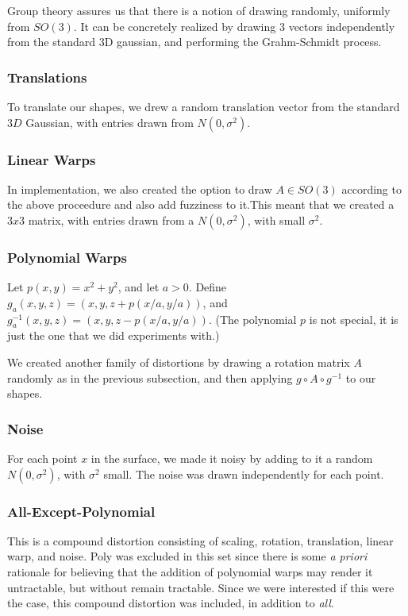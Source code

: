 \documentclass{article}
\begin{document}
Group theory assures us that there is a notion of drawing randomly, uniformly from $SO(3)$.
It can be concretely realized by drawing $3$ vectors independently from the standard 3D gaussian,
and performing the Grahm-Schmidt process.

\subsubsection{Translations}

To translate our shapes, we drew a random translation vector from the standard $3D$ Gaussian, with entries drawn from $N(0,\sigma^2)$.

\subsubsection{Linear Warps}

In implementation, we also created the option to draw $A \in SO(3)$ according to the above proceedure
and also add fuzziness to it.This meant that we created a $3x3$ matrix, with entries drawn from a
$N(0, \sigma^2)$, with small $\sigma^2$.

\subsubsection{Polynomial Warps}

Let $p(x,y) = x^2 + y^2$, and let $a > 0$. Define $g_a(x,y,z) = (x,y,z + p(x/a,y/a))$,
and $g_a^{-1}(x,y,z) = (x,y,z - p(x/a,y/a))$. (The polynomial $p$ is not special,
it is just the one that we did experiments with.)

We created another family of distortions by drawing a rotation matrix $A$ randomly
as in the previous subsection, and then applying $g \circ A \circ g^{-1}$ to our shapes.

\subsubsection{Noise}

For each point $x$ in the surface, we made it noisy by adding to it a random
$N(0, \sigma^2)$, with $\sigma^2$ small. The noise was drawn independently for each point.

\subsubsection{All-Except-Polynomial}
This is a compound distortion consisting of scaling, rotation, translation, linear warp, and noise.
Poly was excluded in this set since there is some \textit{a priori} rationale for believing that the
addition of polynomial warps may render it untractable, but without remain tractable. Since we were
interested if this were the case, this compound distortion was included, in addition to \textit{all}.
\end{document}
